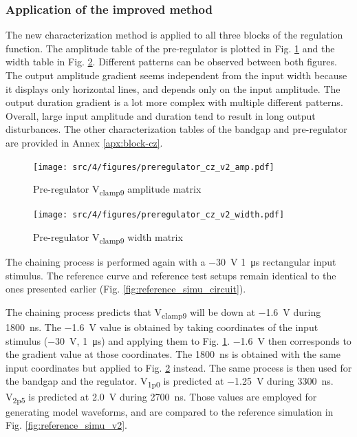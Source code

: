 \subsubsection{Application of the improved method}

The new characterization method is applied to all three blocks of the regulation function.
The amplitude table of the pre-regulator is plotted in Fig. \ref{fig:pre_regu_amp} and the width table in Fig. \ref{fig:pre_regu_width}.
Different patterns can be observed between both figures.
The output amplitude gradient seems independent from the input width because it displays only horizontal lines, and depends only on the input amplitude.
The output duration gradient is a lot more complex with multiple different patterns.
Overall, large input amplitude and duration tend to result in long output disturbances.
The other characterization tables of the bandgap and pre-regulator are provided in Annex \ref{apx:block-cz}.

\begin{figure}[!h]
  \centering
  \texttt{[image: src/4/figures/preregulator\_cz\_v2\_amp.pdf]}
  \caption{Pre-regulator V\textsubscript{clamp9} amplitude matrix}
  \label{fig:pre_regu_amp}
\end{figure}

\begin{figure}[!h]
  \centering
  \texttt{[image: src/4/figures/preregulator\_cz\_v2\_width.pdf]}
  \caption{Pre-regulator V\textsubscript{clamp9} width matrix}
  \label{fig:pre_regu_width}
\end{figure}

The chaining process is performed again with a \SI{-30}{\volt} \SI{1}{\micro\second} rectangular input stimulus.
The reference curve and reference test setups remain identical to the ones presented earlier (Fig. \ref{fig:reference_simu_circuit}).

The chaining process predicts that V\textsubscript{clamp9} will be down at \SI{-1.6}{\volt} during \SI{1800}{\nano\second}.
The \SI{-1.6}{\volt} value is obtained by taking coordinates of the input stimulus (\SI{-30}{\volt}, \SI{1}{\micro\second}) and applying them to Fig. \ref{fig:pre_regu_amp}.
\SI{-1.6}{\volt} then corresponds to the gradient value at those coordinates.
The \SI{1800}{\nano\second} is obtained with the same input coordinates but applied to Fig. \ref{fig:pre_regu_width} instead.
The same process is then used for the bandgap and the regulator.
V\textsubscript{1p0} is predicted at \SI{-1.25}{\volt} during \SI{3300}{\nano\second}.
V\textsubscript{2p5} is predicted at \SI{2.0}{\volt} during \SI{2700}{\nano\second}.
Those values are employed for generating model waveforms, and are compared to the reference simulation in Fig. \ref{fig:reference_simu_v2}.

